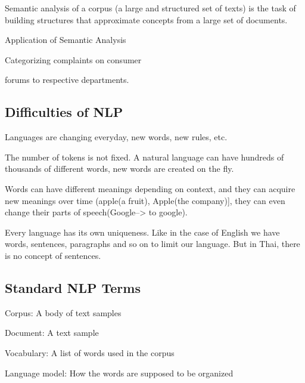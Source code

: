 \begin{bulletedlist}
		\begin{bulletedlist}
			\item Semantic analysis of a corpus (a large and structured set of texts) is the task of building structures that approximate concepts from a large set of documents.
			\item Application of Semantic Analysis
			\begin{bulletedlist}
				\item
				\begin{bulletedlist}
					\item Categorizing complaints on consumer
					\item forums to respective departments.
				\end{bulletedlist}
			\end{bulletedlist}
		\end{bulletedlist}
	\end{bulletedlist}

	\subsection{Difficulties of NLP}
	\begin{bulletedlist}
		\item Languages are changing everyday, new words, new rules, etc.
		\item The number of tokens is not fixed. A natural language can have hundreds of thousands of different words, new words are created on the fly.
		\item Words can have different meanings depending on context, and they can acquire new meanings over time (apple(a fruit), Apple(the company)], they can even change their parts of speech(Google--> to google).
		\item Every language has its own uniqueness. Like in the case of English we have words, sentences, paragraphs and so on to limit our language. But in Thai, there is no concept of sentences.
	\end{bulletedlist}

	\subsection{Standard NLP Terms}
	\begin{bulletedlist}
		\item Corpus: A body of text samples
		\item Document: A text sample
		\item Vocabulary: A list of words used in the corpus
		\item Language model: How the words are supposed to be organized
	\end{bulletedlist}

